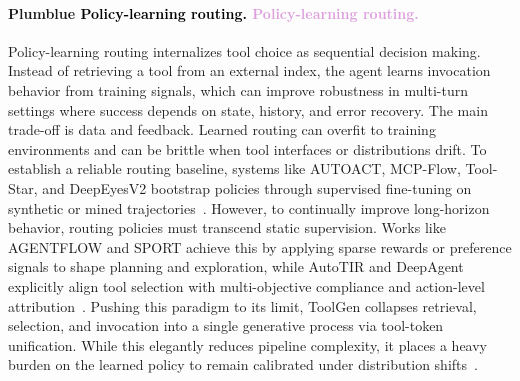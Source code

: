 \documentclass{article}
\let\oldtextcolor\textcolor
\renewcommand{\textcolor}[2]{
  \def\temp{#1}
  \def\red{blue}
  \ifx\temp\red
    \oldtextcolor{black}{#2}
  \else
    \oldtextcolor{#1}{#2}
  \fi
}
\begin{document}
\paragraph{\textcolor{Plum}{Policy-learning routing.}} Policy-learning routing internalizes tool choice as sequential decision making. Instead of retrieving a tool from an external index, the agent learns invocation behavior from training signals, which can improve robustness in multi-turn settings where success depends on state, history, and error recovery. The main trade-off is data and feedback. Learned routing can overfit to training environments and can be brittle when tool interfaces or distributions drift. To establish a reliable routing baseline, systems like AUTOACT, MCP-Flow, Tool-Star, and DeepEyesV2 bootstrap policies through supervised fine-tuning on synthetic or mined trajectories~\citep{qiao2024autoactautomaticagentlearning, wang2025mcpflowfacilitatingllmagents, dong2025tool, hong2025deepeyesv2agenticmultimodalmodel}. However, to continually improve long-horizon behavior, routing policies must transcend static supervision. Works like AGENTFLOW and SPORT achieve this by applying sparse rewards or preference signals to shape planning and exploration, while AutoTIR and DeepAgent explicitly align tool selection with multi-objective compliance and action-level attribution~\citep{li2025intheflowagenticoptimizationeffective, li2025iterative, wei2025autotirautonomoustoolsintegrated, li2025deepagentgeneralreasoningagent}. Pushing this paradigm to its limit, ToolGen collapses retrieval, selection, and invocation into a single generative process via tool-token unification. While this elegantly reduces pipeline complexity, it places a heavy burden on the learned policy to remain calibrated under distribution shifts~\citep{wang2025toolgenunifiedtoolretrieval}.
\end{document}
